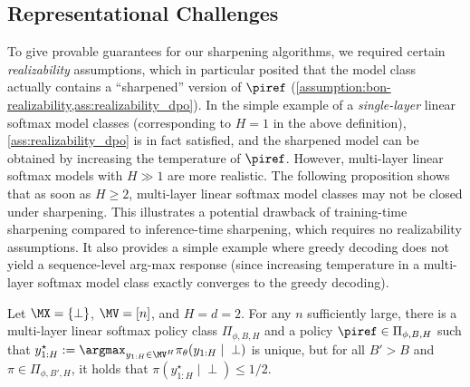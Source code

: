 \subsection{Representational Challenges}
\label{sec:representational}

To give provable guarantees for our sharpening algorithms, we required certain \emph{realizability} assumptions, which in particular posited that the model class actually contains a ``sharpened'' version of $\piref$ (\cref{assumption:bon-realizability,ass:realizability_dpo}). In the simple example of a \emph{single-layer} linear softmax model classes (corresponding to $H=1$ in the above definition), \cref{ass:realizability_dpo} is in fact satisfied, and the sharpened model can be obtained by increasing the temperature of $\piref$. However, multi-layer linear softmax models with $H \gg 1$ are more realistic. The following proposition shows that as soon as $H \geq 2$, multi-layer linear softmax model classes may not be closed under sharpening. This illustrates a potential drawback of training-time sharpening compared to inference-time sharpening, which requires no realizability assumptions. It also provides a simple example where greedy decoding does not yield a sequence-level arg-max response (since increasing temperature in a multi-layer softmax model class exactly converges to the greedy decoding).

\begin{proposition}\label{prop:softmax-representational-lb}
Let $\MX = \{\perp\}$, $\MV = [n]$, and $H = d = 2$. For any $n$ sufficiently large, there is a multi-layer linear softmax policy class $\Pi_{\phi,B,H}$ and a policy $\piref \in \Pi_{\phi,B,H}$ such that $y^\star_{1:H} := \argmax_{y_{1:H} \in \MV^H} \pi_\theta(y_{1:H}\mid{} \perp)$ is unique, but for all $B' > B$ and $\pi \in \Pi_{\phi,B',H}$, it holds that $\pi(y^\star_{1:H}\mid{}\perp) \leq 1/2$.
\end{proposition}

